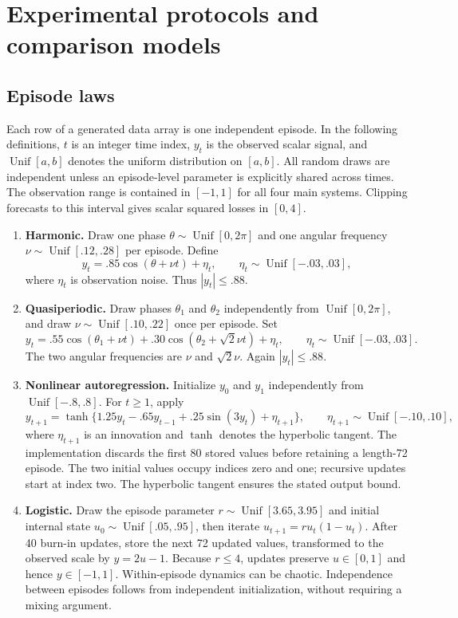 \section{Experimental protocols and comparison models}
\label{app:protocols}

\subsection{Episode laws}

Each row of a generated data array is one independent episode. In the
following definitions, $t$ is an integer time index, $y_t$ is the observed
scalar signal, and $\operatorname{Unif}[a,b]$ denotes the uniform distribution
on $[a,b]$. All random draws are independent unless an episode-level parameter
is explicitly shared across times. The observation range is contained in
$[-1,1]$ for all four main systems. Clipping forecasts to this interval gives
scalar squared losses in $[0,4]$.
\begin{enumerate}[leftmargin=*,itemsep=5pt]
\item \textbf{Harmonic.} Draw one phase
$\theta\sim\operatorname{Unif}[0,2\pi]$ and one angular frequency
$\nu\sim\operatorname{Unif}[.12,.28]$ per episode. Define
\[
 y_t=.85\cos(\theta+\nu t)+\eta_t,\qquad
 \eta_t\sim\operatorname{Unif}[-.03,.03],
\]
where $\eta_t$ is observation noise. Thus $|y_t|\leq.88$.
\item \textbf{Quasiperiodic.} Draw phases $\theta_1$ and $\theta_2$
independently from $\operatorname{Unif}[0,2\pi]$, and draw
$\nu\sim\operatorname{Unif}[.10,.22]$ once per episode. Set
\[
 y_t=.55\cos(\theta_1+\nu t)
      +.30\cos(\theta_2+\sqrt2\nu t)+\eta_t,
 \qquad \eta_t\sim\operatorname{Unif}[-.03,.03].
\]
The two angular frequencies are $\nu$ and $\sqrt2\nu$. Again
$|y_t|\leq.88$.
\item \textbf{Nonlinear autoregression.} Initialize $y_0$ and $y_1$
independently from $\operatorname{Unif}[-.8,.8]$. For $t\geq1$, apply
\[
 y_{t+1}=\tanh\{1.25y_t-.65y_{t-1}+.25\sin(3y_t)+\eta_{t+1}\},
 \qquad\eta_{t+1}\sim\operatorname{Unif}[-.10,.10],
\]
where $\eta_{t+1}$ is an innovation and $\tanh$ denotes the hyperbolic
tangent. The implementation discards the first 80 stored values before
retaining a length-72 episode. The two initial values occupy indices zero
and one; recursive updates start at index two. The hyperbolic tangent ensures
the stated output bound.
\item \textbf{Logistic.} Draw the episode parameter
$r\sim\operatorname{Unif}[3.65,3.95]$ and initial internal state
$u_0\sim\operatorname{Unif}[.05,.95]$, then iterate
$u_{t+1}=ru_t(1-u_t)$. After 40 burn-in updates, store the next 72 updated
values, transformed to the observed scale by $y=2u-1$. Because $r\leq4$,
updates preserve $u\in[0,1]$ and hence $y\in[-1,1]$. Within-episode dynamics
can be chaotic. Independence between episodes follows from independent
initialization, without requiring a mixing argument.
\end{enumerate}

